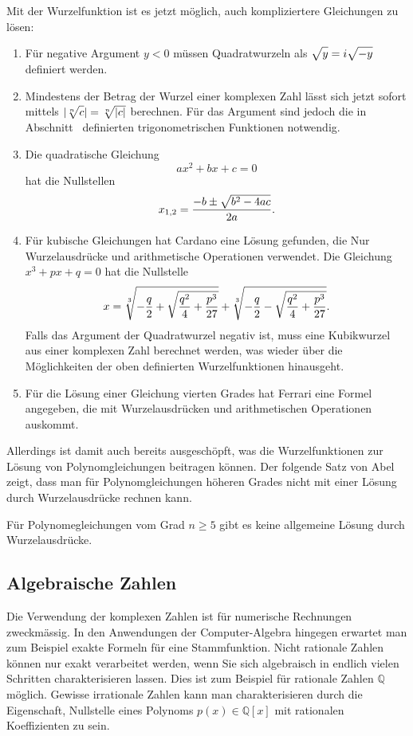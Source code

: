 Mit der Wurzelfunktion ist es jetzt möglich, auch kompliziertere
Gleichungen zu lösen:
\begin{enumerate}
\item
Für negative Argument $y<0$ müssen Quadratwurzeln als
$\sqrt{y\mathstrut}=i\sqrt{-y\mathstrut}$ definiert werden.
\item
Mindestens der Betrag der Wurzel einer komplexen Zahl lässt
sich jetzt sofort mittels $|\root{n}\of{c\mathstrut}|=\root{n}\of{|c|\mathstrut}$
berechnen.
Für das Argument sind jedoch die in
Abschnitt~\label{buch:geometrie:section:trigonometrisch} definierten
trigonometrischen Funktionen notwendig.
\item
Die quadratische Gleichung 
\[
ax^2+bx+c=0
\]
hat die Nullstellen
\[
x_{1,2} = \frac{-b\pm\sqrt{b^2-4ac\mathstrut}}{2a}.
\]
\item
Für kubische Gleichungen hat Cardano eine Lösung gefunden, die
Nur Wurzelausdrücke und arithmetische Operationen verwendet.
Die Gleichung $x^3+px+q=0$ hat die Nullstelle
\[
x
=
\root{3}\of{-\frac{q}2+\sqrt{\frac{q^2}4+\frac{p^3}{27}}}
+
\root{3}\of{-\frac{q}2-\sqrt{\frac{q^2}4+\frac{p^3}{27}}}.
\]
Falls das Argument der Quadratwurzel negativ ist, muss eine
Kubikwurzel aus einer komplexen Zahl berechnet werden, was
wieder über die Möglichkeiten der oben definierten Wurzelfunktionen
hinausgeht.
\item
Für die Lösung einer Gleichung vierten Grades hat Ferrari eine
Formel angegeben, die mit Wurzelausdrücken und arithmetischen
Operationen auskommt.
\end{enumerate}

Allerdings ist damit auch bereits ausgeschöpft, was die
Wurzelfunktionen zur Lösung von Polynomgleichungen beitragen
können.
Der folgende Satz von Abel zeigt, dass man für Polynomgleichungen
höheren Grades nicht mit einer Lösung durch Wurzelausdrücke
rechnen kann.

\begin{satz}[Abel]
\label{buch:potenzen:satz:abel}
Für Polynomegleichungen vom Grad $n\ge 5$ gibt es keine allgemeine
Lösung durch Wurzelausdrücke.
\end{satz}



%
%
\subsection{Algebraische Zahlen}
Die Verwendung der komplexen Zahlen ist für numerische Rechnungen
zweckmässig.
In den Anwendungen der Computer-Algebra hingegen erwartet man zum
Beispiel exakte Formeln für eine Stammfunktion.
Nicht rationale Zahlen können nur exakt verarbeitet werden, wenn
Sie sich algebraisch in endlich vielen Schritten charakterisieren
lassen.
Dies ist zum Beispiel für rationale Zahlen $\mathbb{Q}$ möglich.
Gewisse irrationale Zahlen kann man charakterisieren durch 
die Eigenschaft, Nullstelle eines Polynoms $p(x)\in\mathbb{Q}[x]$
mit rationalen Koeffizienten zu sein.

